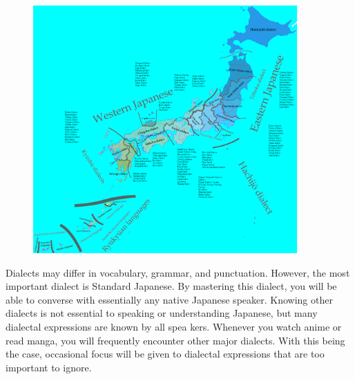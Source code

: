 \begin{figure}[h]
\centering

\includegraphics[width=0.9\textwidth]{figs/第01章/第7課:_10majoraspects_fig/Japanese_dialects.png}

\end{figure}
 
\par{ Dialects may differ in vocabulary, grammar, and punctuation. However, the most important dialect is Standard Japanese. By mastering this dialect, you will be able to converse with essentially any native Japanese speaker. Knowing other dialects is not essential to speaking or understanding Japanese, but many dialectal expressions are known by all spea kers. Whenever you watch anime or read manga, you will frequently encounter other major dialects. With this being the case, occasional focus will be given to dialectal expressions that are too important to ignore. }
    